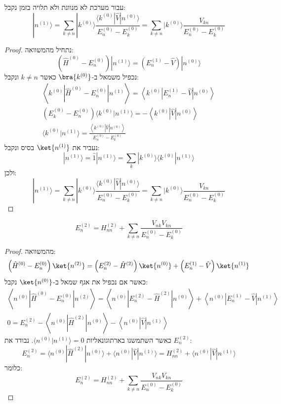 \documentclass{tstextbook}
\begin{document}
\begin{proposition}
עבור מערכת לא מנוונת ולא תלויה בזמן נקבל:
$$|n^{(1)}\rangle=\sum_{k\neq n}|k^{(0)}\rangle\frac{\langle k^{(0)}|\hat{V}|n^{(0)}\rangle}{E_{n}^{(0)}-E_{k}^{(0)}}=\sum_{k\neq n}|k^{(0)}\rangle\frac{V_{k n}}{E_{n}^{(0)}-E_{k}^{(0)}}$$

\end{proposition}
\begin{proof}
נתחיל מהמשוואה:
$$(\hat{H}^{(0)}-E_{n}^{(0)})|n^{(1)}\rangle=(E_{n}^{(1)}-\hat{V})|n^{(0)}\rangle$$
נכפיל משמאל ב-\(\bra{k^{(0)}}\) כאשר \(k\neq n\) ונקבל:
$$\begin{gather}{{\left\langle  k^{(0)}|\hat{H}^{(0)}-E_{n}^{(0)}|n^{(1)} \right\rangle}}={{\left\langle  k^{(0)}|E_{n}^{(1)}-\hat{V}|n^{(0)} \right\rangle}}\\ {{(E_{k}^{(0)}-E_{n}^{(0)})\langle k^{(0)}|n^{(1)}\rangle}}={{-\left\langle  k^{(0)}|\hat{V}|n^{(0)} \right\rangle}}\\{{\langle k^{(0)}|n^{(1)}\rangle}}={{\frac{\left\langle  k^{(0)}|\hat{V}|n^{(0)} \right\rangle}{E_{n}^{(0)}-E_{k}^{(0)}}}}
\end{gather}$$
נעביר את \(\ket{n^{(1)}}\) בסיס ונקבל:
$$|n^{(1)}\rangle=\hat{1}|n^{(1)}\rangle=\sum_{k}|k^{(0)}\rangle\langle k^{(0)}|n^{(1)}\rangle$$
ולכן:
$$|n^{(1)}\rangle=\sum_{k\neq n}|k^{(0)}\rangle\frac{\langle k^{(0)}|\hat{V}|n^{(0)}\rangle}{E_{n}^{(0)}-E_{k}^{(0)}}=\sum_{k\neq n}|k^{(0)}\rangle\frac{V_{k n}}{E_{n}^{(0)}-E_{k}^{(0)}}$$

\end{proof}
\begin{proposition}
$$E_{n}^{(2)}=H_{n n}^{(2)}+\sum_{k\neq n}\frac{V_{n k}V_{k n}}{E_{n}^{(0)}-E_{k}^{(0)}}$$

\end{proposition}
\begin{proof}
מהמשוואה:
$${\left( \hat{H}^{(0)}-E_{n}^{(0)} \right)\ket{n^{(2)}} =\left( E_{n}^{(2)}-\hat{H}^{(2)} \right)\ket{n^{(0)}} +\left( E_{n}^{(1)}-\hat{V} \right)\ket{n^{(1)}} }$$
כאשר אם נכפיל את אגף שמאל ב-\(\ket{n^{(0)}}\) נקבל:
$$\begin{gather}\left\langle  n^{(0)}|\hat{H}^{(0)}-E_{n}^{(0)}|n^{(2)} \right\rangle=\left\langle  n^{(0)}|E_{n}^{(2)}-\hat{H}^{(2)}|n^{(0)} \right\rangle+\left\langle  n^{(0)}|E_{n}^{(1)}-\hat{V}|n^{(1)} \right\rangle\\ 0={{E_{n}^{(2)}-\left\langle  n^{(0)}|\hat{H}^{(2)}|n^{(0)} \right\rangle-\left\langle  n^{(0)}|\hat{V}|n^{(1)} \right\rangle}}
\end{gather}$$
כאשר השתמשנו בארתוגונאליות \(\langle n^{(0)}|n^{(1)} \rangle=0\). נבודד את \(E_{n}^{(2)}\):
$$E_{n}^{(2)}=\langle n^{(0)}|\hat{H}^{(2)}|n^{(0)}\rangle+\langle n^{(0)}|\hat{V}|n^{(1)}\rangle=H_{n n}^{(2)}+\langle n^{(0)}|\hat{V}|n^{(1)}\rangle$$
כלומר:
$$E_{n}^{(2)}=H_{n n}^{(2)}+\sum_{k\neq n}\frac{V_{n k}V_{k n}}{E_{n}^{(0)}-E_{k}^{(0)}}$$

\end{proof}
\end{document}
